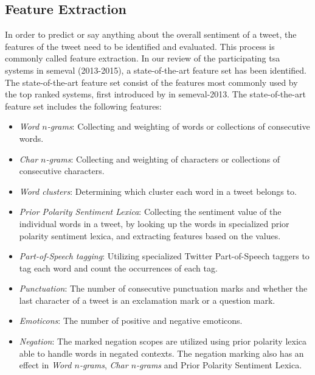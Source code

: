 \subsection{Feature Extraction}
In order to predict or say anything about the overall sentiment of a tweet, the features of the tweet need to be identified and evaluated. This process is commonly called feature extraction. In our review of the participating \ac{tsa} systems in \ac{semeval} (2013-2015), a state-of-the-art feature set has been identified. The state-of-the-art feature set consist of the features most commonly used by the top ranked systems, first introduced by \cite{MohammadKZ2013} in \ac{semeval}-2013. The state-of-the-art feature set includes the following features:

\begin{itemize}
    \item \textit{Word $n$-grams}: Collecting and weighting of words or collections of consecutive words.
    \item \textit{Char $n$-grams}: Collecting and weighting of characters or collections of consecutive characters.
    \item \textit{Word clusters}: Determining which cluster each word in a tweet belongs to. 
    \item \textit{Prior Polarity Sentiment Lexica}: Collecting the sentiment value of the individual words in a tweet, by looking up the words in specialized prior polarity sentiment lexica, and extracting features based on the values.
    \item \textit{Part-of-Speech tagging}: Utilizing specialized Twitter Part-of-Speech taggers to tag each word and count the occurrences of each tag.
    \item \textit{Punctuation}: The number of consecutive punctuation marks and whether the last character of a tweet is an exclamation mark or a question mark.
    \item \textit{Emoticons}: The number of positive and negative emoticons.
    \item \textit{Negation}: The marked negation scopes are utilized using prior polarity lexica able to handle words in negated contexts. The negation marking also has an effect in \textit{Word $n$-grams}, \textit{Char $n$-grams} and Prior Polarity Sentiment Lexica.
\end{itemize}



